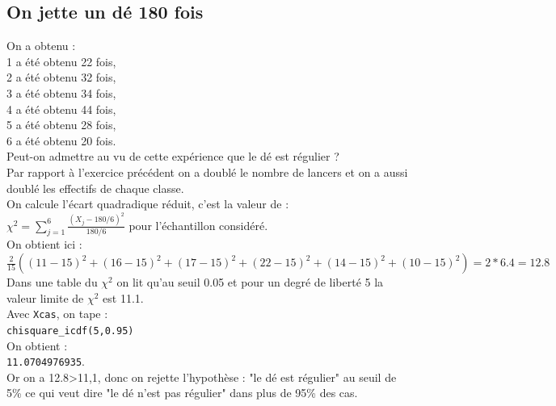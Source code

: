 \documentclass[a4paper,11pt]{book}
\begin{document}
\subsection{On jette un d\'e 180 fois}
 On a obtenu :\\
1 a \'et\'e obtenu 22 fois,\\
2 a \'et\'e obtenu 32 fois,\\
3 a \'et\'e obtenu 34 fois,\\
4 a \'et\'e obtenu 44 fois,\\
5 a \'et\'e obtenu 28 fois,\\
6 a \'et\'e obtenu 20 fois.\\
Peut-on admettre au vu de cette exp\'erience que le d\'e est r\'egulier ?\\   
Par rapport \`a l'exercice pr\'ec\'edent on a doubl\'e le nombre de lancers et
on a  aussi doubl\'e les effectifs de chaque classe.\\
On calcule l'\'ecart quadradique r\'eduit, c'est la valeur de :\\
$\chi^2=\sum_{j=1}^6 \frac{(X_j-180/6)^2}{180/6}$ pour l'\'echantillon consid\'er\'e.\\
On obtient ici :\\
$\frac{2}{15}((11-15)^2+(16-15)^2+(17-15)^2+(22-15)^2+(14-15)^2+(10-15)^2)=2*6.4=12.8$\\
Dans une table du $\chi^2$ on lit qu'au seuil 0.05 et pour un degr\'e de 
libert\'e 5 la valeur limite de $\chi^2$ est 11.1. \\
Avec {\tt Xcas}, on tape :\\
{\tt chisquare\_icdf(5,0.95)}\\
On obtient :\\
{\tt 11.0704976935}.\\
Or on a 12.8>11,1, donc 
on rejette l'hypoth\`ese : "le d\'e est r\'egulier" au seuil de 5\% ce qui 
veut dire  "le d\'e n'est pas r\'egulier" dans plus de 95\% des cas.
\end{document}
